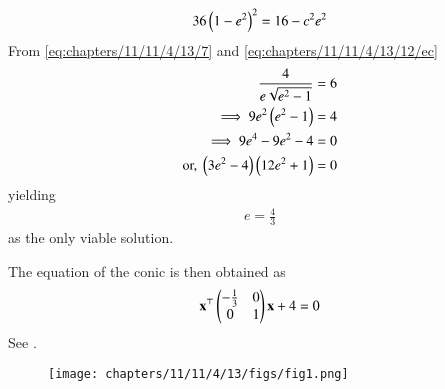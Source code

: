 \begin{enumerate}
		\begin{align}
	36\left(1-e^2\right)^2 = 16-c^2e^2
\label{eq:chapters/11/11/4/13/12/ec}
\end{align}
From
	\eqref{eq:chapters/11/11/4/13/7}
	and
\eqref{eq:chapters/11/11/4/13/12/ec}
\begin{align}
\frac{4}{e\sqrt{e^2-1}} &= 6
\\
\implies 9e^2\left(e^2-1\right) &= 4\\
\implies 9e^4-9e^2-4 &= 0
\\
	\text{or, }\left(3e^2-4\right)
	\left(12e^2+1\right) &=0
\label{eq:chapters/11/11/4/13/14}
\end{align}
yielding
\begin{align}
e = \frac{4}{3}
\end{align}
as the only viable solution.
\end{enumerate}
The equation of the conic is then obtained as
\begin{align}
\mathbf{x}^\top\begin{pmatrix}-\frac{1}{3}&0\\0&1\end{pmatrix}\mathbf{x} +4 = 0
\end{align}
See .
\begin{figure}[H]
\centering
\texttt{[image: chapters/11/11/4/13/figs/fig1.png]}
\caption{}
\label{fig:chapters/11/11/4/13/1}
\end{figure}
\begin{table}[H]
\centering

\caption{}
\label{tab:chapters/11/11/4/13/1}
\end{table}
